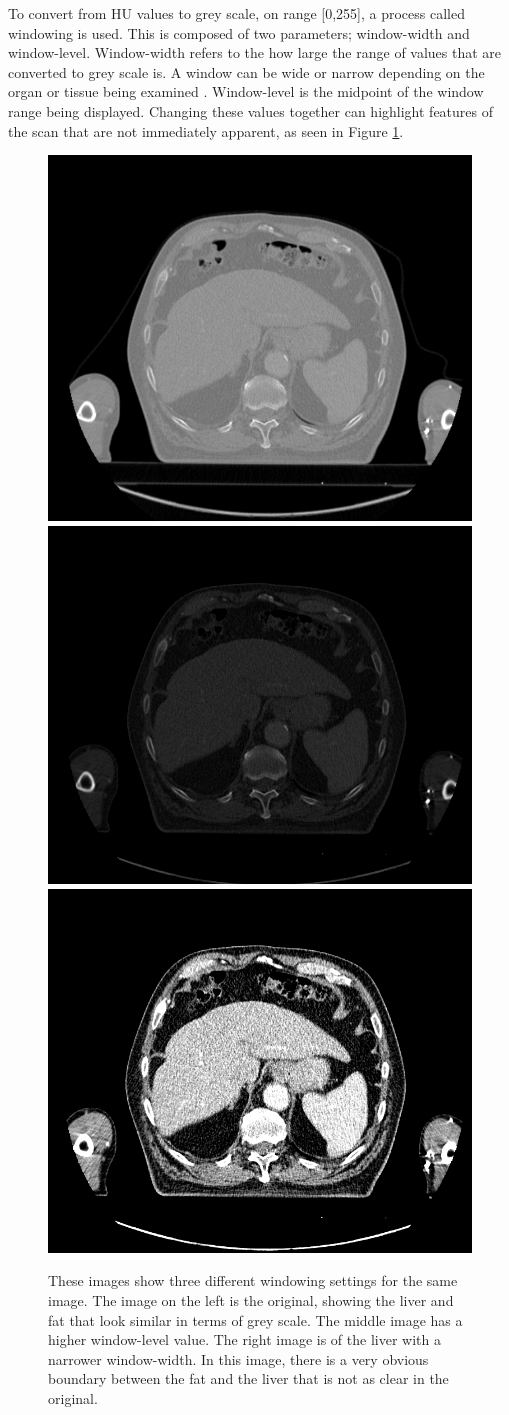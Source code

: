 \documentclass[12pt]{article}
\begin{document}

To convert from HU values to grey scale, on range [0,255], a process called windowing is used. This is composed of two parameters; window-width and window-level. Window-width refers to the how large the range of values that are converted to grey scale is. A window can be wide or narrow depending on the organ or tissue being examined \cite{window_level} \cite{Xue:2012aa}. Window-level is the midpoint of the window range being displayed. Changing these values together can highlight features of the scan that are not immediately apparent, as seen in Figure \ref{window_level_figure}.

\begin{figure}[htp]

\centering
\includegraphics[width=.3\textwidth]{graphics/window_level_orig.png}\hfill
\includegraphics[width=.3\textwidth]{graphics/level_change.png}\hfill
\includegraphics[width=.3\textwidth]{graphics/window_change.png}

\caption{These images show three different windowing settings for the same image. The image on the left is the original, showing the liver and fat that look similar in terms of grey scale. The middle image has a higher window-level value. The right image is of the liver with a narrower window-width. In this image, there is a very obvious boundary between the fat and the liver that is not as clear in the original.}
\label{window_level_figure}
\end{figure}
\end{document}
